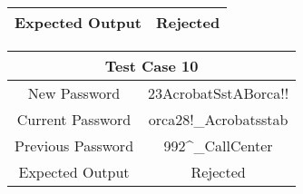 \documentclass[12pt,letterpaper]{article}
\begin{document}
\begin{table}[h]
\begin{centering}
\begin{tabular}{||c|c||}
  \hline
  Expected Output & Rejected \\
  \hline
  \end{tabular}
  \begin{tabular}{||c|c||}
  \hline
  \multicolumn{2}{||c||}{Test Case 10} \\
  \hline
  New Password & 23AcrobatSstABorca!! \\
  \hline
  Current Password & orca28!\_Acrobatsstab \\
  \hline
  Previous Password & 992\^{}\_CallCenter \\
  \hline
  Expected Output & Rejected \\
  \hline
  \end{tabular}



\end{centering}


\end{table}
\end{document}
